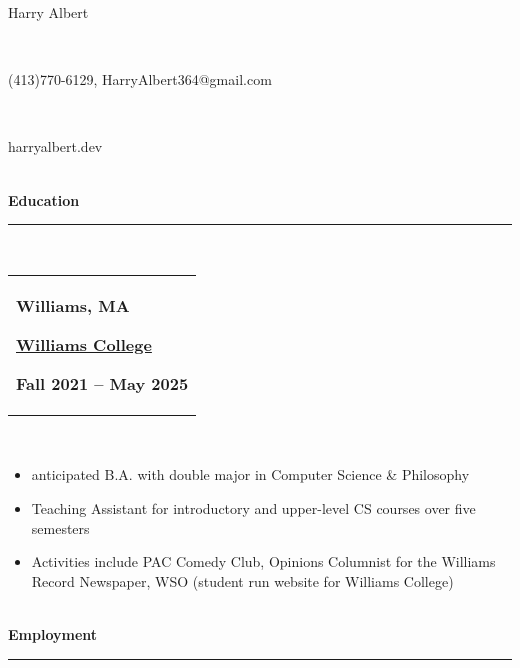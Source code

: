 \documentclass[10pt]{article}
\begin{document}
\thispagestyle{empty}
\vspace{-\baselineskip}
\begin{center}
\Large Harry Albert
\end{center}
\vspace{-6.5ex}~\\ 
\vspace{-\baselineskip}
\begin{center}
\normalsize (413)770-6129, HarryAlbert364@gmail.com
\end{center}
\vspace{-6ex}~\\ 
\vspace{-\baselineskip}
\begin{center}
\normalsize harryalbert.dev
\end{center}
\vspace{-6ex}~\\ 
\textbf{Education}\\[-2ex]
\rule{\textwidth}{0.4pt}\\ 
\begin{tabular}{@{}p{\textwidth}}\begin{minipage}[t]{0.333\textwidth}
\raggedright
\textbf{Williams, MA}
\end{minipage}%
\begin{minipage}[t]{0.333\textwidth}
\centering
\textbf{\underline{Williams College}}
\end{minipage}%
\begin{minipage}[t]{0.333\textwidth}
\raggedleft
\textbf{Fall 2021 – May 2025}
\end{minipage}%
\end{tabular}\\[0.5ex]
\vspace{-\baselineskip}
\begin{itemize}[itemsep=0pt, topsep=0pt]
\item anticipated B.A. with double major in Computer Science \& Philosophy
\item Teaching Assistant for introductory and upper-level CS courses over five semesters
\item Activities include PAC Comedy Club, Opinions Columnist for the Williams Record Newspaper, WSO (student run website for Williams College)
\end{itemize}~\\[-1ex]
\textbf{Employment}\\[-2ex]
\rule{\textwidth}{0.4pt}\\ 
\end{document}
